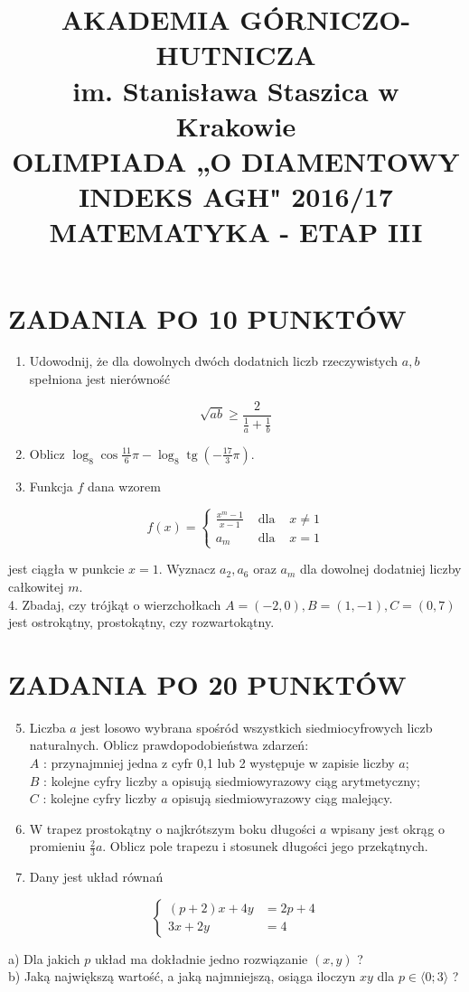 \documentclass[10pt]{article}
\title{AKADEMIA GÓRNICZO-HUTNICZA \\
 im. Stanisława Staszica w Krakowie \\
 OLIMPIADA „O DIAMENTOWY INDEKS AGH" 2016/17 \\
 MATEMATYKA - ETAP III }
\author{}
\date{}
\begin{document}
\maketitle
\section*{ZADANIA PO 10 PUNKTÓW}
\begin{enumerate}
  \item Udowodnij, że dla dowolnych dwóch dodatnich liczb rzeczywistych $a, b$ spełniona jest nierówność
\end{enumerate}

$$
\sqrt{a b} \geqslant \frac{2}{\frac{1}{a}+\frac{1}{b}}
$$

\begin{enumerate}
  \setcounter{enumi}{1}
  \item Oblicz $\log _{8} \cos \frac{11}{6} \pi-\log _{8} \operatorname{tg}\left(-\frac{17}{3} \pi\right)$.
  \item Funkcja $f$ dana wzorem
\end{enumerate}

$$
f(x)=\left\{\begin{array}{ccc}
\frac{x^{m}-1}{x-1} & \text { dla } & x \neq 1 \\
a_{m} & \text { dla } & x=1
\end{array}\right.
$$

jest ciągła w punkcie $x=1$. Wyznacz $a_{2}, a_{6}$ oraz $a_{m}$ dla dowolnej dodatniej liczby całkowitej $m$.\\
4. Zbadaj, czy trójkąt o wierzchołkach $A=(-2,0), B=(1,-1), C=(0,7)$ jest ostrokątny, prostokątny, czy rozwartokątny.

\section*{ZADANIA PO 20 PUNKTÓW}
\begin{enumerate}
  \setcounter{enumi}{4}
  \item Liczba $a$ jest losowo wybrana spośród wszystkich siedmiocyfrowych liczb naturalnych. Oblicz prawdopodobieństwa zdarzeń:\\
$A$ : przynajmniej jedna z cyfr 0,1 lub 2 występuje w zapisie liczby $a$;\\
$B$ : kolejne cyfry liczby a opisują siedmiowyrazowy ciąg arytmetyczny;\\
$C$ : kolejne cyfry liczby $a$ opisują siedmiowyrazowy ciąg malejący.
  \item W trapez prostokątny o najkrótszym boku długości $a$ wpisany jest okrąg o promieniu $\frac{2}{3} a$. Oblicz pole trapezu i stosunek długości jego przekątnych.
  \item Dany jest układ równań
\end{enumerate}

$$
\left\{\begin{aligned}
(p+2) x+4 y & =2 p+4 \\
3 x+2 y & =4
\end{aligned}\right.
$$

a) Dla jakich $p$ układ ma dokładnie jedno rozwiązanie $(x, y)$ ?\\
b) Jaką największą wartość, a jaką najmniejszą, osiąga iloczyn $x y$ dla $p \in\langle 0 ; 3\rangle$ ?
\end{document}
